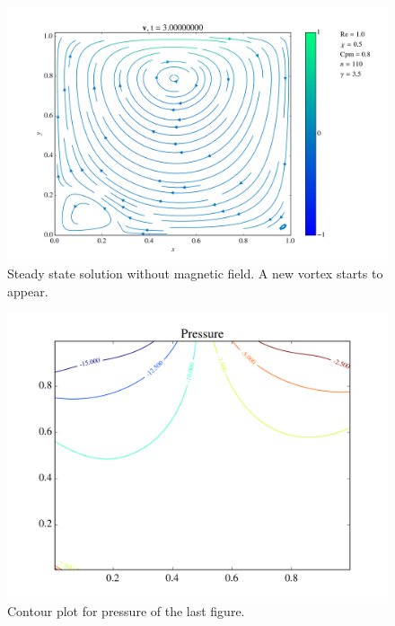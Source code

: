 \documentclass[journal]{IEEEtran}
\begin{document}
\begin{figure}[!t]
\centering
\includegraphics[width=\linewidth]{figures/Re001/w/vectorField}
\caption{Steady state solution without magnetic field. A new vortex starts to appear. \label{Re001wVectorField}}
\end{figure}

\begin{figure}[!t]
\centering
\includegraphics[width=\linewidth]{figures/Re001/w/pressure}
\caption{Contour plot for pressure of the last figure. \label{Re001wPressure}}
\end{figure}
\end{document}
